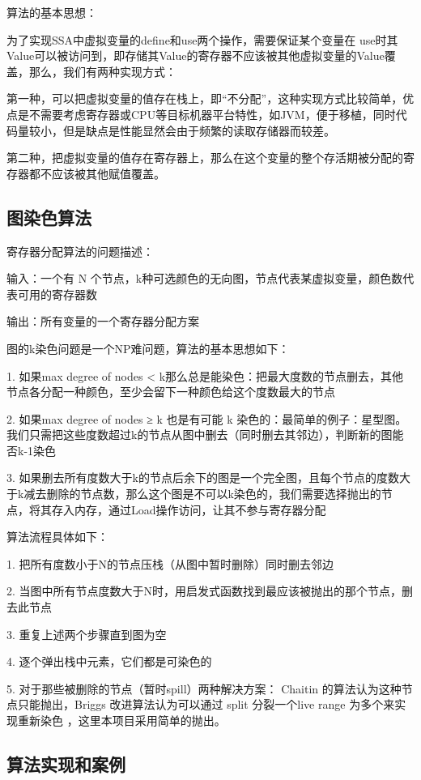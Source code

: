 算法的基本思想：

为了实现SSA中虚拟变量的define和use两个操作，需要保证某个变量在 use时其Value可以被访问到，即存储其Value的寄存器不应该被其他虚拟变量的Value覆盖，那么，我们有两种实现方式：

第一种，可以把虚拟变量的值存在栈上，即“不分配”，这种实现方式比较简单，优点是不需要考虑寄存器或CPU等目标机器平台特性，如JVM，便于移植，同时代码量较小，但是缺点是性能显然会由于频繁的读取存储器而较差。

第二种，把虚拟变量的值存在寄存器上，那么在这个变量的整个存活期被分配的寄存器都不应该被其他赋值覆盖。

\subsection{图染色算法}
寄存器分配算法的问题描述：

输入：一个有 N 个节点，k种可选颜色的无向图，节点代表某虚拟变量，颜色数代表可用的寄存器数

输出：所有变量的一个寄存器分配方案

图的k染色问题是一个NP难问题，算法的基本思想如下：

1. 如果max degree of nodes <    k那么总是能染色：把最大度数的节点删去，其他节点各分配一种颜色，至少会留下一种颜色给这个度数最大的节点

2. 如果max degree of nodes ≥ k 也是有可能 k 染色的：最简单的例子：星型图。我们只需把这些度数超过k的节点从图中删去（同时删去其邻边），判断新的图能否k-1染色

3. 如果删去所有度数大于k的节点后余下的图是一个完全图，且每个节点的度数大于k减去删除的节点数，那么这个图是不可以k染色的，我们需要选择抛出的节点，将其存入内存，通过Load操作访问，让其不参与寄存器分配


算法流程具体如下：

1. 把所有度数小于N的节点压栈（从图中暂时删除）同时删去邻边

2. 当图中所有节点度数大于N时，用启发式函数找到最应该被抛出的那个节点，删去此节点

3. 重复上述两个步骤直到图为空

4. 逐个弹出栈中元素，它们都是可染色的

5. 对于那些被删除的节点（暂时spill）两种解决方案： Chaitin 的算法认为这种节点只能抛出，Briggs 改进算法认为可以通过 split 分裂一个live range 为多个来实现重新染色\cite{10.1145/177492.177575} ，这里本项目采用简单的抛出。





\subsection{算法实现和案例}


